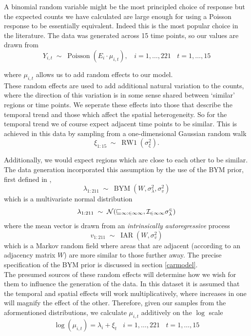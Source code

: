 \documentclass{report}
\begin{document}
A binomial random variable might be the most principled choice of response but the expected counts we have calculated are large enough for using a Poisson response to be essentially equivalent. Indeed this is the most popular choice in the literature. The data was generated across 15 time points, so our values are drawn from
\begin{equation}
Y_{i,t} \; \sim \; \operatorname{Poisson}(E_i \cdot \mu_{i,t}), \ \ \ \ i=1,\ldots,221 \ \ \ \ t=1,\ldots,15
\end{equation} 

where $\mu_{i,t}$ allows us to add random effects to our model. \\

These random effects are used to add additional natural variation to the counts, where the direction of this variation is in some sense shared between `similar' regions or time points. We seperate these effects into those that describe the temporal trend and those which affect the spatial heterogeneity. So for the temporal trend we of course expect adjacent time points to be similar. This is achieved in this data by sampling from a one-dimensional Gaussian random walk
\begin{equation}
\xi_{1:15} \; \sim \; \operatorname{RW1}(\sigma_{\xi}^2).
\end{equation}

Additionally, we would expect regions which are close to each other to be similar. The data generation incorporated this assumption by the use of the BYM prior, first defined in \cite{bym},
\begin{equation}
\lambda_{1:211} \; \sim \; \operatorname{BYM}(W, \sigma_{\lambda}^2, \sigma_v^2) 
\end{equation}
which is a multivariate normal distribution
\begin{equation}
\lambda_{1:211} \; \sim \; \cal{N}(v_{1:211}, I_{211}\sigma_{\lambda}^2)
\end{equation} 
where the mean vector is drawn from an \emph{intrinsically autoregressive} process
\begin{equation}
v_{1:211} \; \sim \; \operatorname{IAR}(W, \sigma_v^2)
\end{equation}
which is a Markov random field where areas that are adjacent (according to an adjacency matrix $W$) are more similar to those further away. The precise specification of the BYM prior is discussed in section \ref{carmodel}. \\

The presumed sources of these random effects will determine how we wish for them to influence the generation of the data. In this dataset it is assumed that the temporal and spatial effects will work multiplicatively, where increases in one will magnify the effect of the other. Therefore, given our samples from the aformentioned distributions, we calculate $\mu_{i,t}$ additively on the $\log$ scale
\begin{equation}
\log{(\mu_{i,t})} = \lambda_i + \xi_t \ \ \ \ i=1,\ldots,221 \ \ \ \ t=1,\ldots,15
\end{equation}
\end{document}
